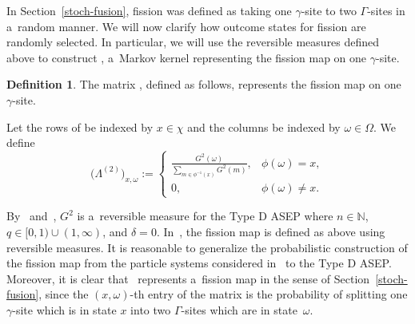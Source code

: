 \documentclass[pdftex]{sigma}
\numberwithin{equation}{section}
\theoremstyle{definition}
\newtheorem{Definition}[Theorem]{Definition}
\begin{document}
In Section~\ref{stoch-fusion}, fission was defined as taking one $\gamma$-site to two $\Gamma$-sites in a~random manner. We will now clarify how outcome states for fission are randomly selected. In particular, we will use the reversible measures defined above to construct , a~Markov kernel representing the fission map on one $\gamma$-site.

\begin{Definition}
 \label{LambdaTwo}
 The matrix , defined as follows, represents the fission map on one $\gamma$-site.

 Let the rows of  be indexed by $x \in \chi$ and the columns be indexed by $\omega \in \Omega$. We define
\[
 \bigl(\Lambda^{(2)}\bigr)_{x, \omega} :=
 \begin{cases}
 \frac{G^2(\omega)}{\sum\limits_{m \in \phi^{-1}(x)} G^2(m)}, & \phi(\omega) = x ,\\
 0, & \phi(\omega) \neq x.
 \end{cases}
\]
\end{Definition}
By~\cite[Proposition 1.3]{kuan2020interactingparticlesystemstype} and~\cite[Section 3.1]{Blyschak_2023}, $G^2$ is a~reversible measure for the Type D ASEP where $n \in \mathbb{N}$, $q \in [0,1) \cup(1,\infty)$, and $\delta = 0$. In~\cite{kuan2019stochastic}, the fission map is defined as above using reversible measures. It is reasonable to generalize the probabilistic construction of the fission map from the particle systems considered in~\cite{kuan2019stochastic} to the Type D ASEP. Moreover, it is clear that~ represents a~fission map in the sense of Section~\ref{stoch-fusion}, since the $(x,\omega)$-th entry of the matrix is the probability of splitting one $\gamma$-site which is in state $x$ into two $\Gamma$-sites which are in state~$\omega$.
\end{document}
